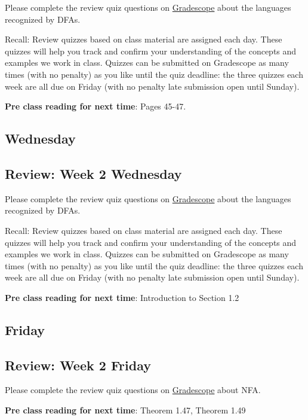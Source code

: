 Please complete the review quiz questions on \href{http://gradescope.com}{Gradescope} about 
the languages recognized by DFAs.


Recall: Review quizzes based on class material are assigned each day. 
These quizzes will help you track and confirm your understanding of the concepts and examples 
we work in class. Quizzes can be submitted on Gradescope as many times (with no penalty) as 
you like until the quiz deadline: the three quizzes each week are all due on Friday (with no penalty 
late submission open until Sunday).

{\bf Pre class reading for next time}: Pages 45-47.


\newpage
\subsection*{Wednesday}



\newpage
\subsection*{Review: Week 2 Wednesday}

Please complete the review quiz questions on \href{http://gradescope.com}{Gradescope} about 
the languages recognized by DFAs.


Recall: Review quizzes based on class material are assigned each day. 
These quizzes will help you track and confirm your understanding of the concepts and examples 
we work in class. Quizzes can be submitted on Gradescope as many times (with no penalty) as 
you like until the quiz deadline: the three quizzes each week are all due on Friday (with no penalty 
late submission open until Sunday).


{\bf Pre class reading for next time}: Introduction to Section 1.2

\newpage
\subsection*{Friday}




\newpage

\subsection*{Review: Week 2 Friday}


Please complete the review quiz questions on \href{http://gradescope.com}{Gradescope} about 
NFA.

{\bf Pre class reading for next time}: Theorem 1.47, Theorem 1.49

\newpage
